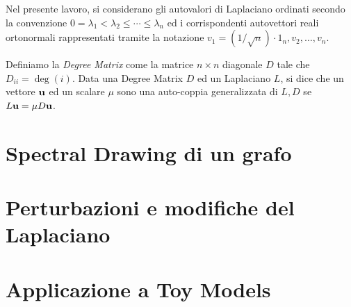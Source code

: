 \documentclass[10pt,a4paper]{article}
\begin{document}
Nel presente lavoro, si considerano gli autovalori di Laplaciano ordinati secondo la convenzione \(0 = \lambda_1 < \lambda_2 \leq \cdots \leq \lambda_n\) ed i corrispondenti autovettori reali ortonormali rappresentati tramite la notazione \(v_1 = (1/\sqrt{n})\cdot 1_n, v_2, \ldots, v_n\).

Definiamo la \textit{Degree Matrix} come la matrice \(n\times n\) diagonale \(D\) tale che \(D_{ii} = \deg(i)\).
Data una Degree Matrix \(D\) ed un Laplaciano \(L\), si dice che un vettore \(\vb{u}\) ed un scalare \(\mu \) sono una auto-coppia generalizzata di \(L,D\) se \(L\vb{u}=\mu D \vb{u}\).

\section{Spectral Drawing di un grafo}\label{sec:spectral_drawing}

\section{Perturbazioni e modifiche del Laplaciano}\label{sec:perturbazioni}

\section{Applicazione a Toy Models}\label{sec:applicazione}
\end{document}
